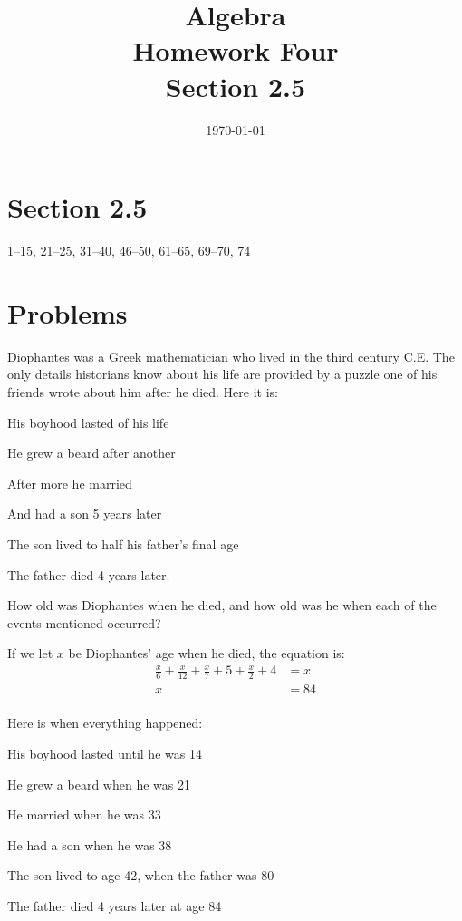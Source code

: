 \documentclass[letterpaper, landscape]{exam}
\title{Algebra \\ Homework Four \\ Section 2.5}
\author{}
\date{\today}
\begin{document}
  \maketitle

  \section{Section 2.5}
  1--15, 21--25, 31--40, 46--50, 61--65, 69--70, 74

  \section{Problems}

  \begin{questions}

    \question{}
    Diophantes was a Greek mathematician who lived in the third century C.E.  The only details
    historians know about his life are provided by a puzzle one of his friends wrote about him after
    he died.  Here it is:

    \begin{itemize*}
      \item His boyhood lasted  of his life
      \item He grew a beard after another 
      \item After  more he married
      \item And had a son 5 years later
      \item The son lived to half his father's final age
      \item The father died 4 years later.
    \end{itemize*}

    How old was Diophantes when he died, and how old was he when each of the events mentioned occurred?

    \begin{solution}
      If we let $x$ be Diophantes' age when he died, the equation is:
      \begin{align*}
        \frac{x}{6} + \frac{x}{12} + \frac{x}{7} + 5 + \frac{x}{2} + 4 & = x \\
        x                                                              & = \boxed{84} \\
      \end{align*}

      Here is when everything happened:
      \begin{itemize*}
        \item His boyhood lasted until he was 14
        \item He grew a beard when he was 21 
        \item He married when he was 33
        \item He had a son when he was 38
        \item The son lived to age 42, when the father was 80
        \item The father died 4 years later at age 84
      \end{itemize*}


\end{solution}
\end{questions}
\end{document}

